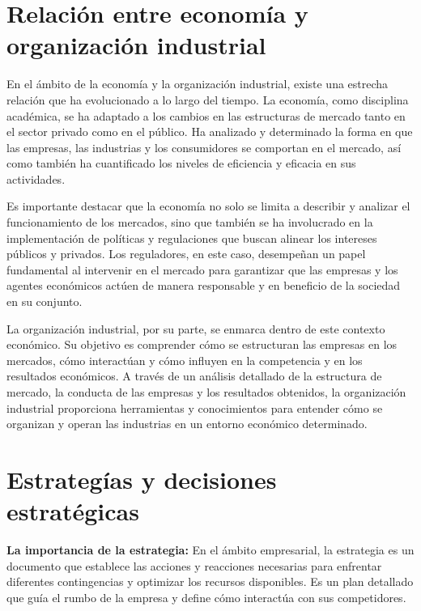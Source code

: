 \documentclass[
  letterpaper,
  DIV=11,
  numbers=noendperiod]{scrartcl}
\begin{document}
\hypertarget{relaciuxf3n-entre-economuxeda-y-organizaciuxf3n-industrial}{%
\section{Relación entre economía y organización
industrial}\label{relaciuxf3n-entre-economuxeda-y-organizaciuxf3n-industrial}}

En el ámbito de la economía y la organización industrial, existe una
estrecha relación que ha evolucionado a lo largo del tiempo. La
economía, como disciplina académica, se ha adaptado a los cambios en las
estructuras de mercado tanto en el sector privado como en el público. Ha
analizado y determinado la forma en que las empresas, las industrias y
los consumidores se comportan en el mercado, así como también ha
cuantificado los niveles de eficiencia y eficacia en sus actividades.

Es importante destacar que la economía no solo se limita a describir y
analizar el funcionamiento de los mercados, sino que también se ha
involucrado en la implementación de políticas y regulaciones que buscan
alinear los intereses públicos y privados. Los reguladores, en este
caso, desempeñan un papel fundamental al intervenir en el mercado para
garantizar que las empresas y los agentes económicos actúen de manera
responsable y en beneficio de la sociedad en su conjunto.

La organización industrial, por su parte, se enmarca dentro de este
contexto económico. Su objetivo es comprender cómo se estructuran las
empresas en los mercados, cómo interactúan y cómo influyen en la
competencia y en los resultados económicos. A través de un análisis
detallado de la estructura de mercado, la conducta de las empresas y los
resultados obtenidos, la organización industrial proporciona
herramientas y conocimientos para entender cómo se organizan y operan
las industrias en un entorno económico determinado.

\hypertarget{estrateguxedas-y-decisiones-estratuxe9gicas}{%
\section{Estrategías y decisiones
estratégicas}\label{estrateguxedas-y-decisiones-estratuxe9gicas}}

\textbf{La importancia de la estrategia:} En el ámbito empresarial, la
estrategia es un documento que establece las acciones y reacciones
necesarias para enfrentar diferentes contingencias y optimizar los
recursos disponibles. Es un plan detallado que guía el rumbo de la
empresa y define cómo interactúa con sus competidores.
\end{document}
